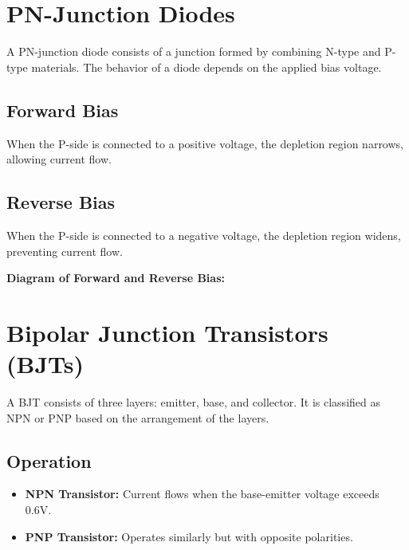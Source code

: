 \section*{PN-Junction Diodes}
A PN-junction diode consists of a junction formed by combining N-type and P-type materials. The behavior of a diode depends on the applied bias voltage.

\subsection{Forward Bias}
When the P-side is connected to a positive voltage, the depletion region narrows, allowing current flow.

\subsection{Reverse Bias}
When the P-side is connected to a negative voltage, the depletion region widens, preventing current flow.

\textbf{Diagram of Forward and Reverse Bias:}

\begin{center}
\end{center}

\section*{Bipolar Junction Transistors (BJTs)}
A BJT consists of three layers: emitter, base, and collector. It is classified as NPN or PNP based on the arrangement of the layers.

\subsection{Operation}
\begin{itemize}
    \item \textbf{NPN Transistor:} Current flows when the base-emitter voltage exceeds 0.6V.
    \item \textbf{PNP Transistor:} Operates similarly but with opposite polarities.
\end{itemize}

